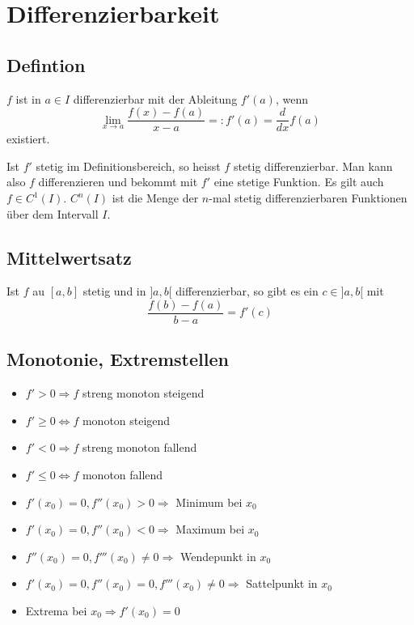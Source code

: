 \section{Differenzierbarkeit}
\subsection{Defintion}
$f$ ist in $a \in I$ differenzierbar mit der Ableitung $f'(a)$, wenn
\[
\lim_{x \to a} \frac{f(x) - f(a)}{x - a} =: f'(a) = \frac{d}{dx}f(a)
\]
existiert.

Ist $f'$ stetig im Definitionsbereich, so heisst $f$ stetig differenzierbar. Man
kann also $f$ differenzieren und bekommt mit $f'$ eine stetige Funktion. Es gilt
auch $f \in C^1(I)$. $C^n(I)$ ist die Menge der $n$-mal stetig differenzierbaren
Funktionen über dem Intervall $I$.

\subsection{Mittelwertsatz}
Ist $f$ au $[a,b]$ stetig und in $]a, b[$ differenzierbar, so gibt es ein $c
\in ]a,b[$ mit
\[
\frac{f(b) - f(a)}{b-a} = f'(c)
\]


\subsection{Monotonie, Extremstellen}
\begin{itemize}
  \item $f' > 0 \Rightarrow f$ streng monoton steigend
  \item $f' \geq 0 \Leftrightarrow f$ monoton steigend
  \item $f' < 0 \Rightarrow f$ streng monoton fallend
  \item $f' \leq 0 \Leftrightarrow f$ monoton fallend
  \item $f'(x_0) = 0, f''(x_0) > 0 \Rightarrow$ Minimum bei $x_0$
  \item $f'(x_0) = 0, f''(x_0) < 0 \Rightarrow$ Maximum bei $x_0$
  \item $f''(x_0) = 0, f'''(x_0) \neq 0 \Rightarrow$ Wendepunkt in $x_0$
  \item $f'(x_0) = 0, f''(x_0) = 0, f'''(x_0) \neq 0 \Rightarrow$ Sattelpunkt in
  $x_0$
  \item Extrema bei $x_0 \Rightarrow f'(x_0) = 0$
\end{itemize}